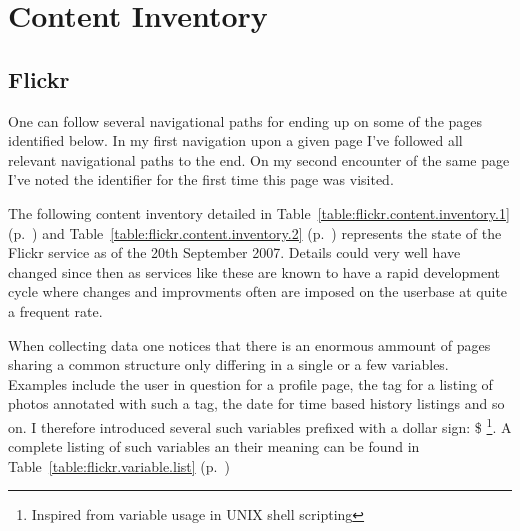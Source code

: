 \chapter{Content Inventory}

\label{appendix:content.inventory}

\section{Flickr}

One can follow several navigational paths for ending up on some of the pages
identified below. In my first navigation upon a given page I've followed all
relevant navigational paths to the end. On my second encounter of the same
page I've noted the identifier for the first time this page was visited.

The following content inventory detailed in
Table~\ref{table:flickr.content.inventory.1}
(p.~\pageref{table:flickr.content.inventory.1}) and
Table~\ref{table:flickr.content.inventory.2}
(p.~\pageref{table:flickr.content.inventory.2})
represents the state of the Flickr service as of the 20th September 2007.
Details could very well have changed since then as
services like these are known to have a rapid development cycle
where changes and improvments often are imposed on the userbase at quite
a frequent rate.

When collecting data one notices that there is an enormous ammount of pages
sharing a common structure only differing in a single or a few variables.
Examples include
the user in question for a profile page, the tag for a listing of photos
annotated with such a tag, the date for time based history listings and so on.
I therefore introduced several such variables prefixed with a dollar sign: \$
\footnote{Inspired from variable usage in UNIX shell scripting}. A complete
listing of such variables an their meaning can be found in
Table~\ref{table:flickr.variable.list}
(p.~\pageref{table:flickr.variable.list})

